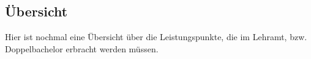 %
%
%
%
%


\subsection{Übersicht} %
Hier ist nochmal eine Übersicht über die Leistungspunkte, die im Lehramt, bzw. Doppelbachelor erbracht werden müssen.

